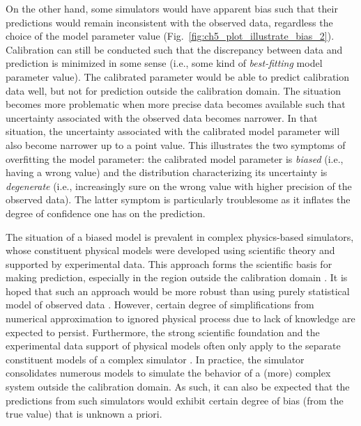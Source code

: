 On the other hand,
some simulators would have apparent bias such that their predictions would remain inconsistent with the observed data, regardless the choice of the model parameter value (Fig.~\ref{fig:ch5_plot_illustrate_bias_2}).
Calibration can still be conducted such that the discrepancy between data and prediction is minimized in some sense (i.e., some kind of \emph{best-fitting} model parameter value).
The calibrated parameter would be able to predict calibration data well, but not for prediction outside the calibration domain.
The situation becomes more problematic when more precise data becomes available such that uncertainty associated with the observed data becomes narrower.
In that situation, the uncertainty associated with the calibrated model parameter will also become narrower up to a point value.
This illustrates the two symptoms of overfitting the model parameter: the calibrated model parameter is \emph{biased} (i.e., having a wrong value) and the distribution characterizing its uncertainty is \emph{degenerate} (i.e., increasingly sure on the wrong value with higher precision of the observed data).
The latter symptom is particularly troublesome as it inflates the degree of confidence one has on the prediction.

The situation of a biased model is prevalent in complex physics-based simulators, whose constituent physical models were developed using scientific theory and supported by experimental data.
This approach forms the scientific basis for making prediction, especially in the region outside the calibration domain \cite{Arhonditsis2008}.
It is hoped that such an approach would be more robust than using purely statistical model of observed data \cite{Bayarri2007,Reichert2012}.
However, certain degree of simplifications from numerical approximation to ignored physical process due to lack of knowledge are expected to persist.
Furthermore, the strong scientific foundation and the experimental data support of physical models often only apply to the separate constituent models of a complex simulator \cite{Campbell2006}.
In practice, the simulator consolidates numerous models to simulate the behavior of a (more) complex system outside the calibration domain.
As such, it can also be expected that the predictions from such simulators would exhibit certain degree of bias (from the true value) that is unknown a priori.

